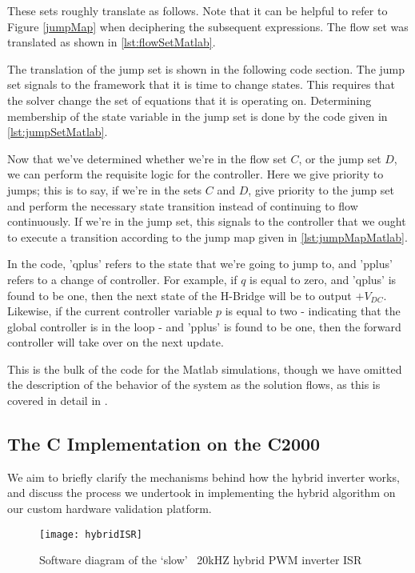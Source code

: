 These sets roughly translate as follows. Note that it can be helpful to refer to Figure \ref{jumpMap} when deciphering the subsequent expressions. The flow set was translated as shown in \ref{lst:flowSetMatlab}.

The translation of the jump set is shown in the following code section. The jump set signals to the framework that it is time to change states. This requires that the solver change the set of equations that it is operating on. Determining membership of the state variable in the jump set is done by the code given in \ref{lst:jumpSetMatlab}.

Now that we've determined whether we're in the flow set $C$, or the jump set $D$, we can perform the requisite logic for the controller. Here we give priority to jumps; this is to say, if we're in the sets $C$ and $D$, give priority to the jump set and perform the necessary state transition instead of continuing to flow continuously. If we're in the jump set, this signals to the controller that we ought to execute a transition according to the jump map given in \ref{lst:jumpMapMatlab}.

In the code, 'qplus' refers to the state that we're going to jump to, and 'pplus' refers to a change of controller. For example, if $q$ is equal to zero, and 'qplus' is found to be one, then the next state of the H-Bridge will be to output $+V_{DC}$. Likewise, if the current controller variable $p$ is equal to two - indicating that the global controller is in the loop - and 'pplus' is found to be one, then the forward controller will take over on the next update. 

This is the bulk of the code for the Matlab simulations, though we have omitted the description of the behavior of the system as the solution flows, as this is covered in detail in \cite{ricardo}.

\subsection{The C Implementation on the C2000}
We aim to briefly clarify the mechanisms behind how the hybrid inverter works, and discuss the process we undertook in implementing the hybrid algorithm on our custom hardware validation platform. 

\begin{figure}[h]
\begin{center}
\texttt{[image: hybridISR]}
\caption{Software diagram of the `slow' ~20kHZ hybrid PWM inverter ISR}
\label{slow}
\end{center}
\end{figure}


